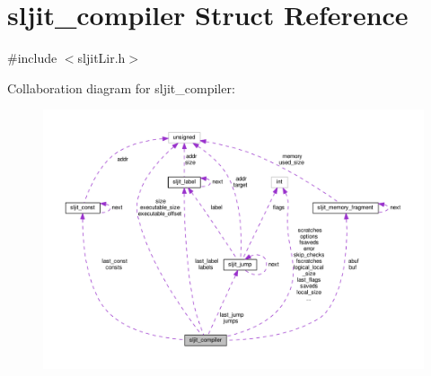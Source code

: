 \hypertarget{structsljit__compiler}{}\section{sljit\+\_\+compiler Struct Reference}
\label{structsljit__compiler}


{\ttfamily \#include $<$sljit\+Lir.\+h$>$}



Collaboration diagram for sljit\+\_\+compiler\+:
\nopagebreak
\begin{figure}[H]
\begin{center}
\leavevmode
\includegraphics[width=350pt]{structsljit__compiler__coll__graph}
\end{center}
\end{figure}

